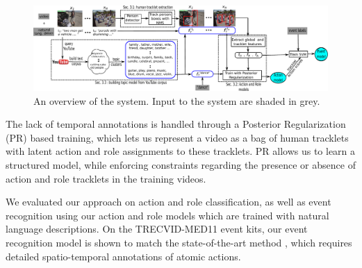 \documentclass[10pt,twocolumn,letterpaper]{article}
\begin{document}
\begin{figure} 
  \includegraphics[scale = 0.44]{../images/system_e.pdf}
  \caption{An overview of the system. Input to the system are shaded in grey.}
\label{fig:system}
\end{figure}

The lack of temporal annotations is handled through a Posterior Regularization
(PR) \cite{Ganchev_JMLR10} based training, which lets us represent a video as a
bag of human tracklets with latent action and role assignments to these
tracklets. PR allows us to learn a structured model, while enforcing
constraints regarding the presence or absence of action and role tracklets in
the training videos. 

We evaluated our approach on action and role classification,
as well as event recognition using our action and role models
which are trained with natural language descriptions.
On the TRECVID-MED11 event kits,
our event recognition model is shown to match
the state-of-the-art method \cite{Izadinia_ECCV12}, which requires
detailed spatio-temporal annotations of atomic actions.

\end{document}

